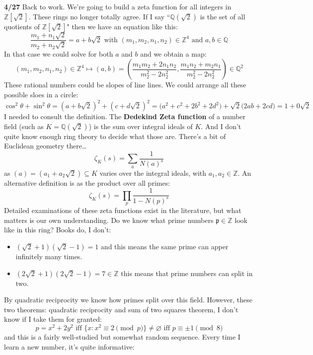 \documentclass[12pt]{article}
\begin{document}
\newpage

\noindent \textbf{4/27} Back to work.  We're going to build a zeta function for all integers in $\mathbb{Z}[\sqrt{2}]$.  These rings no longer totally agree.  If I say ``$\mathbb{Q}(\sqrt{2})$ is the set of all quotients of $\mathbb{Z}[\sqrt{2}]$" then we have an equation like this:
$$  \frac{m_1 + n_1 \sqrt{2}}{m_2 + n_2 \sqrt{2}} = a + b \sqrt{2} \text{ with }(m_1, m_2, n_1, n_2) \in \mathbb{Z}^4
\text{ and }a,b \in \mathbb{Q}$$
In that case we could solve for both $a$ and $b$ and we obtain a map:
$$(m_1, m_2, n_1, n_2) \in \mathbb{Z}^4
\mapsto (a,b) = \left(\frac{m_1 m_2 + 2 n_1 n_2}{m_2^2 - 2 n_2^2},
\frac{m_1 n_2 +  m_2 n_1}{m_2^2 - 2 n_2^2} \right)\in \mathbb{Q}^2 $$
These rational numbers could be slopes of line lines.  We could arrange all these possible sloes in a circle:
$$
\cos^2 \theta + \sin^2 \theta
= (a + b \sqrt{2})^2 + 
(c + d \sqrt{2})^2 = 
\big(a^2 + c^2 + 2b^2 + 2d^2\big)
+ \sqrt{2}\big(2ab + 2cd\big)
 = 1 + 0 \sqrt{2}  $$
I needed to consult the definition.  The \textbf{Dedekind Zeta function} of a number field (such as $K = \mathbb{Q}(\sqrt{2})$) is the sum over integral ideals of $K$.  And I don't quite know enough ring theory to decide what those are.  There's a bit of Euclidean geometry there\dots 
$$ \zeta_K(s) = \sum_a \frac{1}{N(a)^s} $$
as $(a) = (a_1 + a_2 \sqrt{2}) \subseteq K$ varies over the integral ideals, with $a_1, a_2 \in \mathbb{Z}$.  An alternative definition is as the product over all primes:
$$ \zeta_K(s) = \prod_p \frac{1}{1 - N(p)^s} $$
Detailed examinations of these zeta functions exist in the literature, but what matters is our own understanding.  Do we know what prime numbers $\mathfrak{p} \in \mathbb{Z}$ look like in this ring?  Books do, I don't:
\begin{itemize}
\item $(\sqrt{2}+ 1)(\sqrt{2}-1) = 1$ and this means the same prime can apper infinitely many times. 
\item $ (2\sqrt{2} + 1)(2\sqrt{2} - 1) = 7 \in \mathbb{Z}$ this means that prime numbers can split in two.
\end{itemize}
By quadratic reciprocity we know how primes split over this field. 
However, these two theorems: quadratic reciprocity and sum of two squares theorem, I don't know if I take them for granted:
$$ p = x^2 + 2y^2 \text{ iff }\{ x: x^2 \equiv 2\pmod p\} \neq \varnothing \text{ iff } p \equiv \pm 1 \pmod 8 $$
and this is a fairly well-studied but somewhat random sequence.  Every time I learn a new number, it's quite informative:
\end{document}

